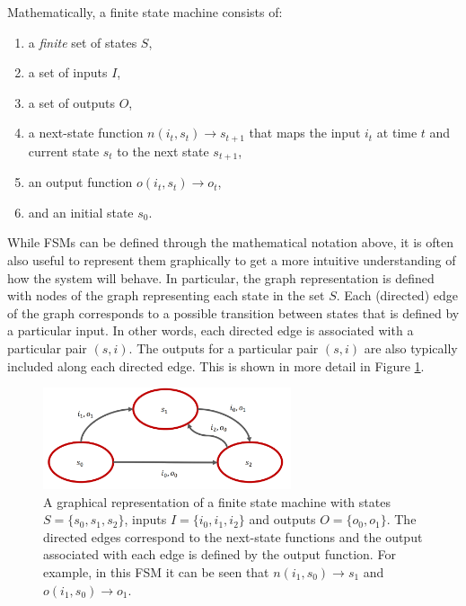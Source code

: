 Mathematically, a finite state machine consists of:
\begin{enumerate}
    \item a \textit{finite} set of states $S$,
    \item a set of inputs $I$,
    \item a set of outputs $O$,
    \item a next-state function $n(i_t, s_t) \xrightarrow{} s_{t+1}$ that maps the input $i_t$ at time $t$ and current state $s_t$ to the next state $s_{t+1}$,
    \item an output function $o(i_t, s_t) \xrightarrow{} o_t$,
    \item and an initial state $s_0$.
\end{enumerate}
While FSMs can be defined through the mathematical notation above, it is often also useful to represent them graphically to get a more intuitive understanding of how the system will behave. In particular, the graph representation is defined with nodes of the graph representing each state in the set $S$. Each (directed) edge of the graph corresponds to a possible transition between states that is defined by a particular input. In other words, each directed edge is associated with a particular pair $(s, i)$. The outputs for a particular pair $(s,i)$ are also typically included along each directed edge. This is shown in more detail in Figure \ref{fig:fsm}.
\begin{figure}[ht]
    \centering
    \includegraphics[width=0.65\textwidth]{tex/figs/ch21_figs/fsm.png}
    \caption{A graphical representation of a finite state machine with states $S = \{s_0, s_1, s_2\}$, inputs $I = \{i_0,i_1,i_2\}$ and outputs $O = \{o_0, o_1\}$. The directed edges correspond to the next-state functions and the output associated with each edge is defined by the output function. For example, in this FSM it can be seen that $n(i_1, s_0) \xrightarrow{} s_1$ and $o(i_1, s_0) \xrightarrow{} o_1$.}
    \label{fig:fsm}
\end{figure}

